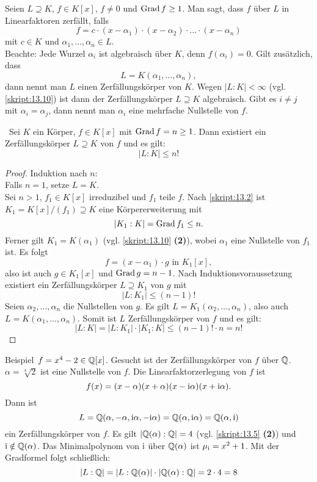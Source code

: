 \begin{df}\label{skript:13.14}
	Seien $L\supseteq K$, $f\in K[x]$, $f\neq0$ und $\operatorname{Grad} f\geq 1$. Man sagt, dass $f$ über $L$ in Linearfaktoren zerfällt, falls
	\[f=c\cdot(x-\alpha_1)\cdot(x-\alpha_2)\cdot\ldots\cdot(x-\alpha_n)\]
	mit $c\in K$ und $\alpha_1,\ldots,\alpha_n\in L$.\\
	Beachte: Jede Wurzel $\alpha_i$ ist algebraisch über $K$, denn $f(\alpha_i)=0$. Gilt zusätzlich, dass
	\[L=K(\alpha_1,\ldots,\alpha_n),\]
	dann nennt man $L$ einen Zerfällungskörper von $K$. Wegen $|L:K|<\infty$ (vgl. \ref{skript:13.10}) ist dann der Zerfällungskörper $L\supseteq K$ algebraisch. Gibt es $i\neq j$ mit $\alpha_i=\alpha_j$, dann nennt man $\alpha_i$ eine mehrfache Nullstelle von $f$.
\end{df}

\begin{sz}\label{skript:13.15}\
	Sei $K$ ein Körper, $f\in K[x]$ mit $\operatorname{Grad} f=n\geq1$. Dann existiert ein Zerfällungskörper $L\supseteq K$ von $f$ und es gilt:
	\[|L:K|\leq n!\]
\end{sz}

\begin{proof}
	Induktion nach $n$:\\
	Falls $n=1$, setze $L=K$.\\
	Sei $n>1$, $f_1\in K[x]$ irreduzibel und $f_1$ teile $f$. Nach \ref{skript:13.2} ist $K_1=K[x]/(f_1)\supseteq K$ eine Körpererweiterung mit
	\[|K_1:K|=\operatorname{Grad} f_1\leq n.\]
	Ferner gilt $K_1=K(\alpha_1)$ (vgl. \ref{skript:13.10} \textbf{(2)}), wobei $\alpha_1$ eine Nullstelle von $f_1$ ist. Es folgt
	\[f=(x-\alpha_1)\cdot g\text{ in }K_1[x],\]
	also ist auch $g\in K_1[x]$ und $\operatorname{Grad} g=n-1$. Nach Induktionsvoraussetzung existiert ein Zerfällungskörper $L\supseteq K_1$ von $g$ mit
	\[|L:K_1|\leq(n-1)!\]
	Seien $\alpha_2,\ldots,\alpha_n$ die Nullstellen von $g$. Es gilt $L=K_1(\alpha_2,\ldots,\alpha_n)$, also auch $L=K(\alpha_1,\ldots,\alpha_n)$. Somit ist $L$ Zerfällungskörper von $f$ und es gilt:
	\[|L:K|=|L:K_1|\cdot|K_1:K|\leq (n-1)!\cdot n=n!\]
\end{proof}

\begin{genericdf}{Beispiel}\label{skript:13.16}\
	$f=x^4-2\in\mathbb{Q}[x]$. Gesucht ist der Zerfällungskörper von $f$ über $\mathbb{Q}$. $\alpha=\sqrt[4]{2}$ ist eine Nullstelle von $f$. Die Linearfaktorzerlegung von $f$ ist
	\[f(x)=(x-\alpha)(x+\alpha)(x-\textrm{i}\alpha)(x+\textrm{i}\alpha).\]
	Dann ist
	\[L=\mathbb{Q}(\alpha,-\alpha,\textrm{i}\alpha,-\textrm{i}\alpha)=\mathbb{Q}(\alpha,\textrm{i}\alpha)=\mathbb{Q}(\alpha,\textrm{i})\]
	ein Zerfällungskörper von $f$. Es gilt $|\mathbb{Q}(\alpha):\mathbb{Q}|=4$ (vgl. \ref{skript:13.5} \textbf{(2)}) und $\textrm{i}\notin\mathbb{Q}(\alpha)$. Das Minimalpolynom von $\textrm{i}$ über $\mathbb{Q}(\alpha)$ ist $\mu_{\textrm{i}}=x^2+1$. Mit der Gradformel folgt schließlich:
	\[|L:\mathbb{Q}|=|L:\mathbb{Q}(\alpha)|\cdot|\mathbb{Q}(\alpha):\mathbb{Q}|=2\cdot4=8\]
\end{genericdf}

